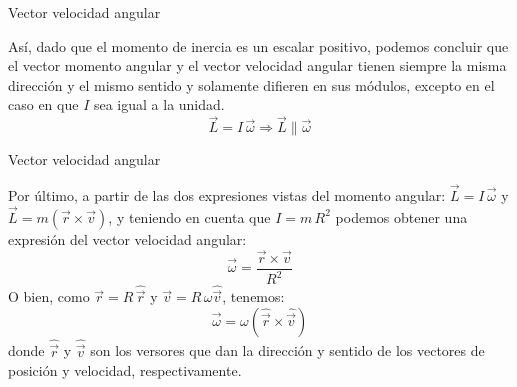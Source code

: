 \documentclass[11pt,handout,aspectratio=1610]{beamer}
\begin{document}
\begin{frame}{Vector velocidad angular}

    Así, dado que el momento de inercia es un escalar positivo, podemos concluir que el vector momento angular y el vector velocidad angular tienen siempre la misma dirección y el mismo sentido y solamente difieren en sus módulos, excepto en el caso en que $I$ sea igual a la unidad. $$ \vec{L} = I \, \vec{\omega} \Rightarrow \vec{L} \parallel \vec{\omega} $$

    \begin{figure}[h]
        \centering
    \end{figure}
    
\end{frame}

\begin{frame}{Vector velocidad angular}

    Por último, a partir de las dos expresiones vistas del momento angular: $\vec{L} = I \, \vec{\omega}$ y $\vec{L} = m \left(\vec{r} \times \vec{v}\right)$, y teniendo en cuenta que $I = m \, R^2$ podemos obtener una expresión del vector velocidad angular: $$\vec{\omega} = \frac{\vec{r} \times \vec{v}}{R^2}$$ O bien, como $\vec{r} = R \, \hat{\vec{r}}$ y $\vec{v} = R \, \omega \hat{\vec{v}}$, tenemos: $$\vec{\omega} = \omega \left(\hat{\vec{r}} \times \hat{\vec{v}}\right)$$ donde $\hat{\vec{r}}$ y $\hat{\vec{v}}$ son los versores que dan la dirección y sentido de los vectores de posición y velocidad, respectivamente.

\end{frame}
\end{document}
